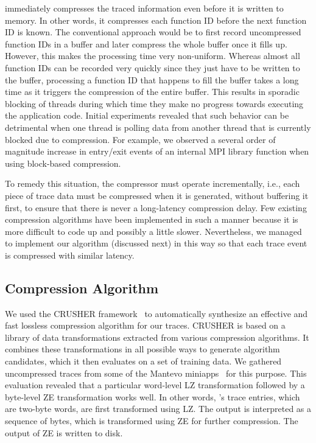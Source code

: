 \parlot immediately compresses the traced information even before it is written to memory. In other words, it compresses each function ID before the next function ID is known. The conventional approach would be to first record uncompressed function IDs in a buffer and later compress the whole buffer once it fills up. However, this makes the processing time very non-uniform. Whereas almost all function IDs can be recorded very quickly since they just have to be written to the buffer, processing a function ID that happens to fill the buffer takes a long time as it triggers the compression of the entire buffer. This results in sporadic blocking of threads during which time they make no progress towards executing the application code. Initial experiments revealed that such behavior can be detrimental when one thread is polling data from another thread that is currently blocked due to compression. For example, we observed a several order of magnitude increase in entry/exit events of an internal MPI library function when using block-based compression.

To remedy this situation, the compressor must operate incrementally, i.e., each piece of trace data must be compressed when it is generated, without buffering it first, to ensure that there is never a long-latency compression delay. Few existing compression algorithms have been implemented in such a manner because it is more difficult to code up and possibly a little slower. Nevertheless, we managed to implement our algorithm (discussed next) in this way so that each trace event is compressed with similar latency.


\subsection{Compression Algorithm}

We used the CRUSHER framework~\cite{Cluster15, Space16, SC16, DCC18} to automatically synthesize an effective and fast lossless compression algorithm for our traces. CRUSHER is based on a library of data transformations extracted from various compression algorithms. It combines these transformations in all possible ways to generate algorithm candidates, which it then evaluates on a set of training data. We gathered uncompressed traces from some of the Mantevo miniapps~\cite{mantevo} for this purpose. This evaluation revealed that a particular word-level LZ transformation followed by a byte-level ZE transformation works well. In other words, \parlot 's trace entries, which are two-byte words, are first transformed using LZ. The output is interpreted as a sequence of bytes, which is transformed using ZE for further compression. The output of ZE is written to disk.

